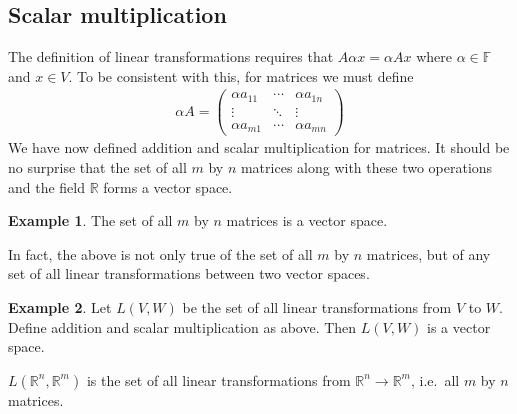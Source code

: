 \documentclass[12pt,reqno]{amsart}
\def\R{\mathbb{R}}
\theoremstyle{definition}
\newtheorem{example}{Example}[section]
\begin{document}
\subsection{Scalar multiplication}
The definition of linear transformations requires that $A \alpha x =
\alpha A x$ where $\alpha \in \mathbb{F}$ and $x \in V$. To be
consistent with this, for matrices we must define
\begin{align*}
  \alpha A = \begin{pmatrix} \alpha a_{11} & \cdots &
    \alpha a_{1n} \\ \vdots & \ddots & \vdots \\ \alpha a_{m1} & \cdots &
    \alpha a_{mn} \end{pmatrix}
\end{align*}
We have now defined addition and scalar multiplication for
matrices. It should be no surprise that the set of all $m$ by $n$
matrices along with these two operations and the field $\R$ forms a
vector space. 
\begin{example}
  The set of all $m$ by $n$ matrices is a vector space. 
\end{example}
In fact, the above is not only true of the set of all
$m$ by $n$ matrices, but of any set of all linear transformations
between two vector spaces.
\begin{example}
  Let $L(V,W)$ be the set of all linear transformations from $V$ to
  $W$. Define addition and scalar multiplication as above. Then 
  $L(V,W)$ is a vector space.
\end{example}
$L(\R^n, \R^m)$ is the set of all linear transformations from $\R^n
\to \R^m$, i.e.\ all $m$ by $n$ matrices. 
\end{document}
